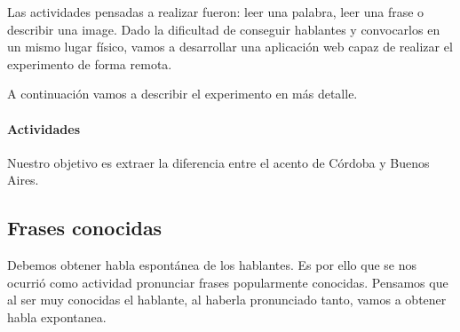 \documentclass[11pt,a4paper,twoside]{tesis}
\begin{document}
Las actividades pensadas a realizar fueron: leer una palabra, leer una frase o describir una image. Dado la dificultad de conseguir hablantes y convocarlos en un mismo lugar físico, vamos a desarrollar una aplicación web capaz de realizar el experimento de forma remota. 

A continuación vamos a describir el experimento en más detalle.

\paragraph{Actividades}

Nuestro objetivo es extraer la diferencia entre el acento de Córdoba y Buenos Aires. 



\subsection{Frases conocidas}

Debemos obtener habla espontánea de los hablantes. Es por ello que se nos ocurrió como actividad pronunciar frases popularmente conocidas. Pensamos que al ser muy conocidas el hablante, al haberla pronunciado tanto, vamos a obtener habla expontanea.

\end{document}
